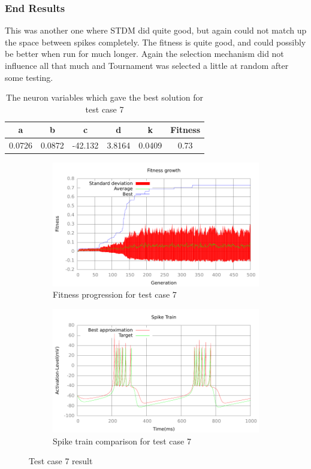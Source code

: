 \subsubsection{End Results}\label{sec:test-case-7-results}
This was another one where STDM did quite good, but again could not match up the
space between spikes completely. The fitness is quite good, and could possibly
be better when run for much longer. Again the selection mechanism did not
influence all that much and Tournament was selected a little at random after
some testing.
\begin{table}
	\begin{tabular}{c c c c c c}
		a & b & c & d & k & Fitness\\
		\hline
		0.0726 & 0.0872 & -42.132 & 3.8164 & 0.0409 & 0.73
	\end{tabular}
	\caption{The neuron variables which gave the best solution for test case
	7}
\end{table}
\begin{figure}[h]
	\centering
	\begin{subfigure}[b]{0.5\textwidth}
		\includegraphics[width=\textwidth]{../output/stdm_izzy_3_fitness.pdf}
		\caption{Fitness progression for test case 7}
		\label{fig:fitness-test-case-7}
	\end{subfigure}%
	\begin{subfigure}[b]{0.5\textwidth}
		\includegraphics[width=\textwidth]{../output/stdm_izzy_3_spike.pdf}
		\caption{Spike train comparison for test case 7}
		\label{fig:spike-test-case-7}
	\end{subfigure}
	\caption{Test case 7 result}
\end{figure}


